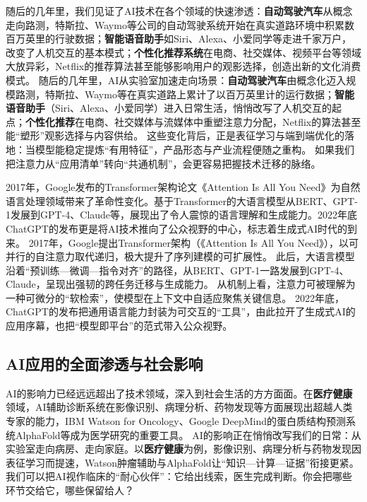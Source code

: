随后的几年里，我们见证了AI技术在各个领域的快速渗透：{\bf 自动驾驶汽车}从概念走向路测，特斯拉、Waymo等公司的自动驾驶系统开始在真实道路环境中积累数百万英里的行驶数据；{\bf 智能语音助手}如Siri、Alexa、小爱同学等走进千家万户，改变了人机交互的基本模式；{\bf 个性化推荐系统}在电商、社交媒体、视频平台等领域大放异彩，Netflix的推荐算法甚至能够影响用户的观影选择，创造出新的文化消费模式。
随后的几年里，AI从实验室加速走向场景：{\bf 自动驾驶汽车}由概念化迈入规模路测，特斯拉、Waymo等在真实道路上累计了以百万英里计的运行数据；{\bf 智能语音助手}（Siri、Alexa、小爱同学）进入日常生活，悄悄改写了人机交互的起点；{\bf 个性化推荐}在电商、社交媒体与流媒体中重塑注意力分配，Netflix的算法甚至能“塑形”观影选择与内容供给。 
这些变化背后，正是表征学习与端到端优化的落地：当模型能稳定提炼“有用特征”，产品形态与产业流程便随之重构。 
如果我们把注意力从“应用清单”转向“共通机制”，会更容易把握技术迁移的脉络。

2017年，Google发布的Transformer架构论文《Attention Is All You Need》为自然语言处理领域带来了革命性变化。基于Transformer的大语言模型从BERT、GPT-1发展到GPT-4、Claude等，展现出了令人震惊的语言理解和生成能力。2022年底ChatGPT的发布更是将AI技术推向了公众视野的中心，标志着生成式AI时代的到来。
2017年，Google提出Transformer架构（《Attention Is All You Need》），以可并行的自注意力取代递归，极大提升了序列建模的可扩展性。 
此后，大语言模型沿着“预训练—微调—指令对齐”的路径，从BERT、GPT-1一路发展到GPT-4、Claude，呈现出强韧的跨任务迁移与生成能力。 
从机制上看，注意力可被理解为一种可微分的“软检索”，使模型在上下文中自适应聚焦关键信息。 
2022年底，ChatGPT的发布把通用语言能力封装为可交互的“工具”，由此拉开了生成式AI的应用序幕，也把“模型即平台”的范式带入公众视野。

\subsection{AI应用的全面渗透与社会影响}

AI的影响力已经远远超出了技术领域，深入到社会生活的方方面面。在{\bf 医疗健康}领域，AI辅助诊断系统在影像识别、病理分析、药物发现等方面展现出超越人类专家的能力，IBM Watson for Oncology、Google DeepMind的蛋白质结构预测系统AlphaFold等成为医学研究的重要工具。
AI的影响正在悄悄改写我们的日常：从实验室走向病房、走向家庭。以{\bf 医疗健康}为例，影像识别、病理分析与药物发现因表征学习而提速，Watson肿瘤辅助与AlphaFold让“知识—计算—证据”衔接更紧。我们可以把AI视作临床的“耐心伙伴”：它给出线索，医生完成判断。你会把哪些环节交给它，哪些保留给人？

